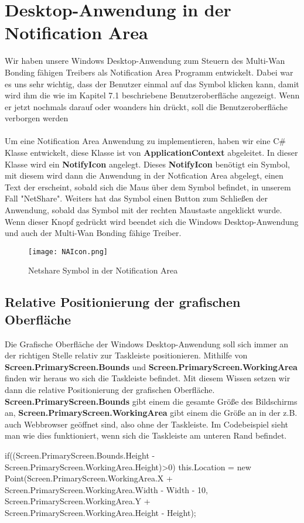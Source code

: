 \section{Desktop-Anwendung in der Notification Area}
Wir haben unsere Windows Desktop-Anwendung zum Steuern des Multi-Wan Bonding fähigen Treibers als Notification Area Programm entwickelt. Dabei war es uns sehr wichtig, dass der Benutzer einmal auf das Symbol klicken kann, damit wird ihm die wie im Kapitel 7.1 beschriebene Benutzeroberfläche angezeigt. Wenn er jetzt nochmals darauf oder woanders hin drückt, soll die Benutzeroberfläche verborgen werden
\\\\
Um eine Notification Area Anwendung zu implementieren, haben wir eine C\# Klasse entwickelt, diese Klasse ist von \textbf{ApplicationContext} abgeleitet. In dieser Klasse wird ein \textbf{NotifyIcon} angelegt. Dieses \textbf{NotifyIcon} benötigt ein Symbol, mit diesem wird dann die Anwendung in der Notfication Area abgelegt, einen Text der erscheint, sobald sich die Maus über dem Symbol befindet, in unserem Fall "NetShare". Weiters hat das Symbol einen Button zum Schließen der Anwendung, sobald das Symbol mit der rechten Maustaste angeklickt wurde. Wenn dieser Knopf gedrückt wird beendet sich die Windows Desktop-Anwendung und auch der Multi-Wan Bonding fähige Treiber.
\begin{figure}[H]
    \centering
    \texttt{[image: NAIcon.png]}
    \caption[NotificationArea]{Netshare Symbol in der Notification Area} 
\end{figure}
\noindent

\newpage
\subsection{Relative Positionierung der grafischen Oberfläche}
Die Grafische Oberfläche der Windows Desktop-Anwendung soll sich immer an der richtigen Stelle relativ zur Taskleiste positionieren. Mithilfe von \textbf{Screen.PrimaryScreen.Bounds} und \textbf{Screen.PrimaryScreen.WorkingArea} finden wir heraus wo sich die Taskleiste befindet. Mit diesem Wissen setzen wir dann die relative Positionierung der grafischen Oberfläche. \textbf{Screen.PrimaryScreen.Bounds} gibt einem die gesamte Größe des Bildschirms an, \textbf{Screen.PrimaryScreen.WorkingArea} gibt einem die Größe an in der z.B. auch Webbrowser geöffnet sind, also ohne der  Taskleiste. Im Codebeispiel sieht man wie dies funktioniert, wenn sich die Taskleiste am unteren Rand befindet.
\begin{program}[H]
\caption{Taskleiste unten}
\begin{CSharpCode}
if((Screen.PrimaryScreen.Bounds.Height - Screen.PrimaryScreen.WorkingArea.Height)>0)
{
    this.Location = new Point(Screen.PrimaryScreen.WorkingArea.X + 
      Screen.PrimaryScreen.WorkingArea.Width - Width - 10, 
      Screen.PrimaryScreen.WorkingArea.Y + Screen.PrimaryScreen.WorkingArea.Height 
      - Height);
}
\end{CSharpCode}
\end{program}
\noindent

